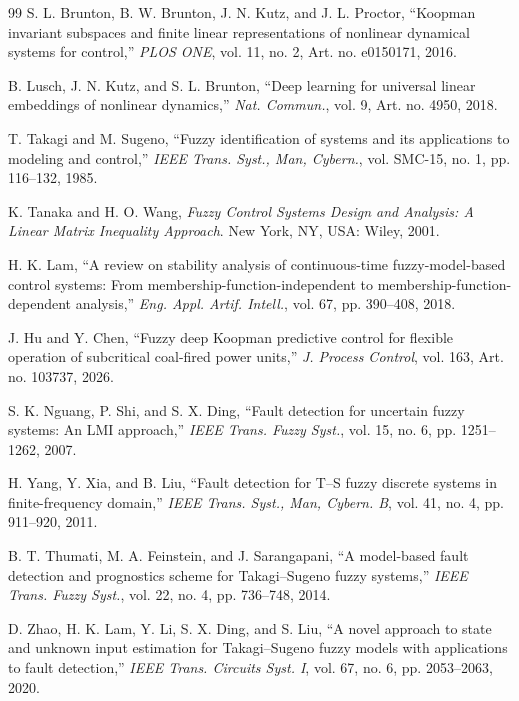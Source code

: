 \documentclass[journal]{IEEEtran}
\newcommand{\1}{\bm 1}
\begin{document}
\begin{thebibliography}{99}
S. L. Brunton, B. W. Brunton, J. N. Kutz, and J. L. Proctor,
``Koopman invariant subspaces and finite linear representations of nonlinear
dynamical systems for control,'' \emph{PLOS ONE}, vol. 11, no. 2,
Art. no. e0150171, 2016.

B. Lusch, J. N. Kutz, and S. L. Brunton, ``Deep learning for universal
linear embeddings of nonlinear dynamics,'' \emph{Nat. Commun.}, vol. 9,
Art. no. 4950, 2018.

T. Takagi and M. Sugeno, ``Fuzzy identification of systems and its
applications to modeling and control,'' \emph{IEEE Trans. Syst., Man,
Cybern.}, vol. SMC-15, no. 1, pp. 116--132, 1985.

K. Tanaka and H. O. Wang, \emph{Fuzzy Control Systems Design and Analysis:
A Linear Matrix Inequality Approach}. New York, NY, USA: Wiley, 2001.

H. K. Lam, ``A review on stability analysis of continuous-time
fuzzy-model-based control systems: From membership-function-independent to
membership-function-dependent analysis,'' \emph{Eng. Appl. Artif. Intell.},
vol. 67, pp. 390--408, 2018.

J. Hu and Y. Chen, ``Fuzzy deep Koopman predictive control for flexible
operation of subcritical coal-fired power units,'' \emph{J. Process Control},
vol. 163, Art. no. 103737, 2026.

S. K. Nguang, P. Shi, and S. X. Ding, ``Fault detection for uncertain fuzzy
systems: An LMI approach,'' \emph{IEEE Trans. Fuzzy Syst.}, vol. 15, no. 6,
pp. 1251--1262, 2007.

H. Yang, Y. Xia, and B. Liu, ``Fault detection for T--S fuzzy discrete
systems in finite-frequency domain,'' \emph{IEEE Trans. Syst., Man, Cybern.
B}, vol. 41, no. 4, pp. 911--920, 2011.

B. T. Thumati, M. A. Feinstein, and J. Sarangapani, ``A model-based fault
detection and prognostics scheme for Takagi--Sugeno fuzzy systems,''
\emph{IEEE Trans. Fuzzy Syst.}, vol. 22, no. 4, pp. 736--748, 2014.

D. Zhao, H. K. Lam, Y. Li, S. X. Ding, and S. Liu, ``A novel approach to
state and unknown input estimation for Takagi--Sugeno fuzzy models with
applications to fault detection,'' \emph{IEEE Trans. Circuits Syst. I},
vol. 67, no. 6, pp. 2053--2063, 2020.


\end{thebibliography}
\end{document}

